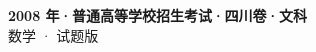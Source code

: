 \documentclass[zihao=-4, a4paper]{ctexart}
\begin{document}
\begin{center}
  {\Large\bfseries 2008 年·普通高等学校招生考试·四川卷·文科}\\[4pt]
  {\large 数学 · 试题版}
\end{center}
\medskip
{}

\end{document}
